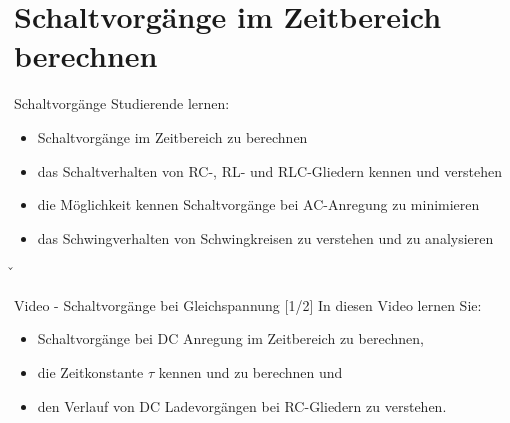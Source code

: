 \section[Berechnung im Zeitbereich]{Schaltvorgänge im Zeitbereich berechnen}
\label{sec:schaltvorgaengezeitbereich}
\begin{frame}\ftx{\secname}
%
    \begin{Lernziele}{Schaltvorgänge}
        Studierende lernen:
        \begin{itemize}\b{\setlength\itemsep{0.7em}}
            \item Schaltvorgänge im Zeitbereich zu berechnen %
            \item das Schaltverhalten von RC-, RL- und RLC-Gliedern kennen und verstehen %
            \item die Möglichkeit kennen Schaltvorgänge bei AC-Anregung zu minimieren%
            \item das Schwingverhalten von Schwingkreisen zu verstehen und zu analysieren %
        \end{itemize}
    \end{Lernziele}
\end{frame}

\v{%
\begin{frame}\ftx{\secname}
    \begin{Lernziele}{Video - Schaltvorgänge bei Gleichspannung [1/2]}
        In diesen Video lernen Sie:
        \begin{itemize}\b{\setlength\itemsep{0.7em}}
        \item Schaltvorgänge bei DC Anregung im Zeitbereich zu berechnen,
        \item die Zeitkonstante $\tau$ kennen und zu berechnen und
        \item den Verlauf von DC Ladevorgängen bei RC-Gliedern zu verstehen.
        \end{itemize}
    \end{Lernziele}%

\end{frame}
}%

